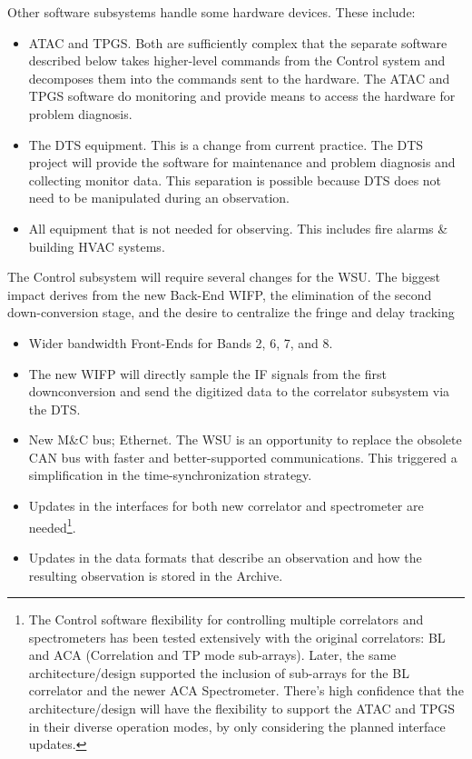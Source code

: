 Other software subsystems handle some hardware devices. These include:
\begin{itemize}[itemsep=-0.5em]
    \item ATAC and TPGS. Both are sufficiently complex that the separate software described below takes higher-level commands from the Control system and decomposes them into the commands sent to the hardware. The ATAC and TPGS software do monitoring and provide means to access the hardware for problem diagnosis.
    \item The \ac{DTS} equipment. This is a change from current practice. The DTS project will provide the software for maintenance and problem diagnosis and collecting monitor data. This separation is possible because DTS does not need to be manipulated during an observation.
    \item All equipment that is not needed for observing. This includes fire alarms \& building \ac{HVAC} systems.
\end{itemize}

The Control subsystem will require several changes for the WSU. The biggest impact derives from the new Back-End \ac{WIFP}, the elimination of the second down-conversion stage, and the desire to centralize the fringe and delay tracking

\begin{itemize}[itemsep=-0.5em]
    \item Wider bandwidth Front-Ends for Bands 2, 6, 7, and 8.
    \item The new \ac{WIFP} will directly sample the IF signals from the first downconversion and send the digitized data to the correlator subsystem via the DTS.
    \item New M\&C bus; Ethernet. The WSU is an opportunity to replace the obsolete CAN bus with faster and better-supported communications. This triggered a simplification in the time-synchronization strategy.
    \item Updates in the interfaces for both new correlator and spectrometer are needed\footnote{The Control software flexibility for controlling multiple correlators and spectrometers has been tested extensively with the original correlators: BL and ACA (Correlation and TP mode sub-arrays). Later, the same architecture/design supported the inclusion of sub-arrays for the BL correlator and the newer ACA Spectrometer. There's high confidence that the architecture/design will have the flexibility to support the ATAC and TPGS in their diverse operation modes, by only considering the planned interface updates.}.
    \item Updates in the data formats that describe an observation and how the resulting observation is stored in the Archive.
\end{itemize}

